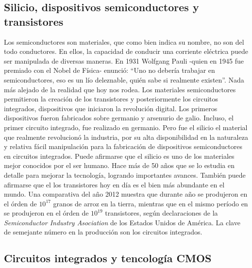 \subsection{Silicio, dispositivos semiconductores y transistores}

Los semiconductores son materiales, que como bien indica su nombre, no son del todo conductores. En ellos, la capacidad de conducir una corriente eléctrica puede ser manipulada de diversas maneras. En 1931 Wolfgang Pauli -quien en 1945 fue premiado con el Nobel de Física- enunció: ``Uno no debería trabajar en semiconductores, eso es un lío deleznable, quién sabe si realmente existen''. Nada más alejado de la realidad que hoy nos rodea. Los materiales semiconductores permitieron la creación de los transistores y posteriormente los circuitos integrados, dispositivos que iniciaron la revolución digital. Los primeros dispositivos fueron fabricados sobre germanio y arsenurio de galio. Incluso, el primer circuito integrado, fue realizado en germanio. Pero fue el 
silicio el material que realmente revolucionó la industria, por su alta disponibilidad en la naturaleza y relativa fácil manipulación para la fabricación de dispositivos semiconductores en circuitos integrados. Puede afirmarse que el silicio es uno de los materiales mejor conocidos por el ser humano. Hace más de 50 años que se lo estudia en detalle para mejorar la tecnología, logrando importantes avances. También puede afirmarse que el los transistores hoy en día es el bien más abundante en el mundo. Una comparativa del año 2012 muestra que durante año se produjeron en el órden de $10^{17}$ granos de arroz en la tierra, mientras que en el mismo período en se produjeron en el órden de $10^{19}$ transistores, según declaraciones de la \emph{Semiconductor Industry Asociation} de los Estados Unidos de América. La clave de semejante número en la producción son los circuitos integrados.

\subsection{Circuitos integrados y tencología CMOS}

